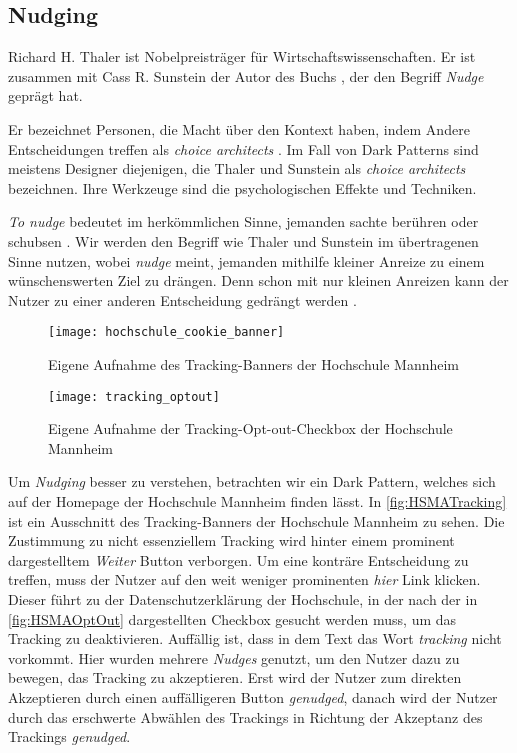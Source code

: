 \documentclass[conference,compsoc,final,a4paper]{IEEEtran}
\begin{document}
\subsection{Nudging}
Richard H. Thaler ist Nobelpreisträger für Wirtschaftswissenschaften. Er ist zusammen mit Cass R. Sunstein der Autor des Buchs  \autocite{Thaler2008}, der den Begriff \textit{Nudge} geprägt hat.

Er bezeichnet Personen, die Macht über den Kontext haben, indem Andere Entscheidungen treffen als \textit{choice architects} \autocite[S. 3]{Thaler2008}. Im Fall von Dark Patterns sind meistens Designer diejenigen, die Thaler und Sunstein als \textit{choice architects} bezeichnen. Ihre Werkzeuge sind die psychologischen Effekte und Techniken.

\textit{To nudge} bedeutet im herkömmlichen Sinne, jemanden sachte berühren oder schubsen \autocite{MerriamWebsterNudge}. Wir werden den Begriff wie Thaler und Sunstein im übertragenen Sinne nutzen, wobei \textit{nudge} meint, jemanden mithilfe kleiner Anreize zu einem wünschenswerten Ziel zu drängen. Denn schon mit nur kleinen Anreizen kann der Nutzer zu einer anderen Entscheidung gedrängt werden \autocite{Narayanan2020}.

\begin{figure}[!ht]
  \centering
  \texttt{[image: hochschule\_cookie\_banner]}
  \caption{Eigene Aufnahme des Tracking-Banners der Hochschule Mannheim~\autocite{HSMAWebsite2021}}
  \label{fig:HSMATracking}
\end{figure}

\begin{figure}[!ht]
  \centering
  \texttt{[image: tracking\_optout]}
  \caption{Eigene Aufnahme der Tracking-Opt-out-Checkbox der Hochschule Mannheim~\autocite{HSMAWebsite2021}}
  \label{fig:HSMAOptOut}
\end{figure}

Um \textit{Nudging} besser zu verstehen, betrachten wir ein Dark Pattern, welches sich auf der Homepage der Hochschule Mannheim finden lässt. In \autoref{fig:HSMATracking} ist ein Ausschnitt des Tracking-Banners der Hochschule Mannheim zu sehen. Die Zustimmung zu nicht essenziellem Tracking wird hinter einem prominent dargestelltem \textit{Weiter} Button verborgen. Um eine konträre Entscheidung zu treffen, muss der Nutzer auf den weit weniger prominenten \textit{hier} Link klicken. Dieser führt zu der Datenschutzerklärung der Hochschule, in der nach der in \autoref{fig:HSMAOptOut} dargestellten Checkbox gesucht werden muss, um das Tracking zu deaktivieren. Auffällig ist, dass in dem Text das Wort \textit{tracking} nicht vorkommt. Hier wurden mehrere \textit{Nudges} genutzt, um den Nutzer dazu zu bewegen, das Tracking zu akzeptieren. Erst wird der Nutzer zum direkten Akzeptieren durch einen auffälligeren Button \textit{genudged}, danach wird der Nutzer durch das erschwerte Abwählen des Trackings in Richtung der Akzeptanz des Trackings \textit{genudged}.
\end{document}
